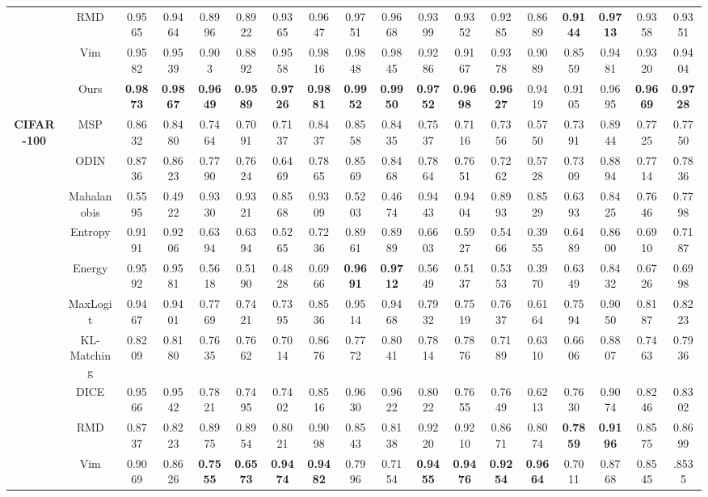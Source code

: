 \documentclass[letterpaper]{article} %
\begin{document}
\begin{table}[!ht]
\begin{adjustbox}{width=17.8cm,center}
\begin{tabular}{c|c|cccccccccccccc|cc}
 & RMD  &0.9565	&0.9464	&0.8996	&0.8922	&0.9365	&0.9647	&0.9751	&0.9668	&0.9399	&0.9352	&0.9285	&0.8689&\textbf{0.9144}&\textbf{0.9713}&0.9358	&0.9351\\
 & Vim &0.9582	&0.9539	&0.903	&0.8892	&0.9558	&0.9816	&0.9848	&0.9845	&0.9286	&0.9167	&0.9378&0.9089&0.8559	&0.9481	&0.9320	&0.9404\\
  \cline{2-18}
 & Ours   &\textbf{0.9873}&\textbf{0.9867}&\textbf{0.9649}&\textbf{0.9589}&\textbf{0.9726}&\textbf{0.9881}&\textbf{0.9952}&\textbf{0.9950}&\textbf{0.9752}&\textbf{0.9698}&\textbf{0.9627}	&0.9419&0.9105	&0.9695	&\textbf{0.9669}&\textbf{0.9728}\\
\hline
 \multirow{12}{*}{\textbf{CIFAR-100}}
 & MSP  &0.8632	&0.8480	&0.7464	&0.7091	&0.7137 &0.8437&0.8558 &0.8435&0.7537&0.7116	&0.7356	&0.5750&0.7391	&0.8944	&0.7725	&0.7750\\
 & ODIN  &0.8736	&0.8623	&0.7790	&0.7624	&0.6469	&0.7865	&0.8569	&0.8468	&0.7864	&0.7651	&0.7262	&0.5728&0.7309	&0.8894	&0.7714	&0.7836\\
 & Mahalanobis &0.5595	&0.4922	&0.9330	&0.9321	&0.8568	&0.9309	&0.5203	&0.4674	&0.9443	&0.9404	&0.8993	&0.8529	&0.6393	&0.8425	&0.7646	&0.7798\\
 & Entropy  &0.9191	&0.9206	&0.6394	&0.6394	&0.5265	&0.7236	&0.8961	&0.8989	&0.6603	&0.5927	&0.5466	&0.3955&0.6489	&0.8600	&0.6910	&0.7187\\
 & Energy &0.9592 &0.9581 &0.5618 &0.5190&0.4828 &0.6966 &\textbf{0.9691} &\textbf{0.9712} &0.5649 &0.5137	&0.5353	&0.3970 &0.6349 &0.8432 &0.6726 &0.6998\\
 & MaxLogit  &0.9467	&0.9401	&0.7769	&0.7421	&0.7395	&0.8536	&0.9514	&0.9468	&0.7932	&0.7519	&0.7637	&0.6164&0.7594	&0.9050	&0.8187	&0.8223\\
 & KL-Matching  &0.8209	&0.8180	&0.7635	&0.7662	&0.7014	&0.8676	&0.7772	&0.8041	&0.7814&0.7876	&0.7189	&0.6310&0.6606	&0.8807	&0.7463	&0.7936\\
 & DICE  &0.9566	&0.9542	&0.7821	&0.7495	&0.7402	&0.8516	&0.9630	&0.9622	&0.8022	&0.7655	&0.7649	&0.6213&0.7630	&0.9074	&0.8246	&0.8302\\
 & RMD  &0.8737	&0.8223	&0.8975	&0.8954	&0.8021	&0.9098	&0.8543	&0.8138&0.9220	&0.9210	&0.8671	&0.8074&\textbf{0.7859}&\textbf{0.9196}&0.8575	&0.8699\\
 & Vim &0.9069&0.8626&\textbf{0.7555}&\textbf{0.6573}&\textbf{0.9474}&\textbf{0.9482}&0.7996	&0.7154	&\textbf{0.9455}&\textbf{0.9476}&\textbf{0.9254}&\textbf{0.9664}&0.7011	&0.8768	&0.8545	&.8535\\

\end{tabular}
\end{adjustbox}
\end{table}
\end{document}
